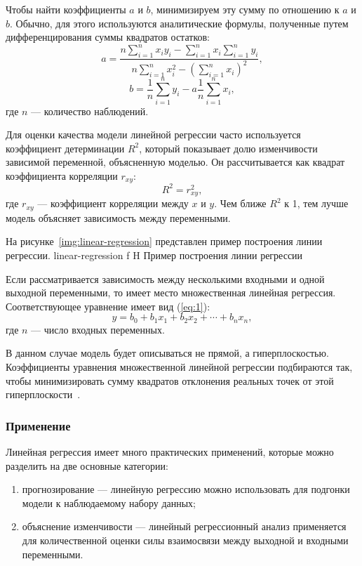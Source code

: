 Чтобы найти коэффициенты $a$ и $b$, минимизируем эту сумму по отношению к $a$ и $b$.
Обычно, для этого используются аналитические формулы, полученные путем дифференцирования суммы квадратов остатков:
\begin{equation}
    a = \frac{n \sum_{i=1}^{n} x_i y_i - \sum_{i=1}^{n} x_i \sum_{i=1}^{n} y_i}{n \sum_{i=1}^{n} x_i^2 - (\sum_{i=1}^{n} x_i)^2},
\end{equation}
\begin{equation}
    b = \frac{1}{n}\sum_{i=1}^{n} y_i - a\frac{1}{n}\sum_{i=1}^{n} x_i,
\end{equation}
где $n$ --- количество наблюдений.

Для оценки качества модели линейной регрессии часто используется коэффициент детерминации $R^2$, который показывает долю изменчивости зависимой переменной, объясненную моделью.
Он рассчитывается как квадрат коэффициента корреляции $r_{xy}$:
\begin{equation}
    R^2 = r_{xy}^2,
\end{equation}
где $r_{xy}$ --- коэффициент корреляции между $x$ и $y$.
Чем ближе $R^2$ к 1, тем лучше модель объясняет зависимость между переменными.

На рисунке~\ref{img:linear-regression} представлен пример построения линии регрессии.
{linear-regression}
{f}
{H}
{\textwidth}
{Пример построения линии регрессии}

Если рассматривается зависимость между несколькими входными и одной выходной переменными, то имеет место множественная линейная регрессия.
Соответствующее уравнение имеет вид (\ref{eq:1}):
\begin{equation}
    y = b_0 + b_1 x_1 + b_2 x_2 + \cdots+ b_n x_n,
    \label{eq:1}
\end{equation}
где $n$ --- число входных переменных.

В данном случае модель будет описываться не прямой, а гиперплоскостью.
Коэффициенты уравнения множественной линейной регрессии подбираются так, чтобы минимизировать сумму квадратов отклонения реальных точек от этой гиперплоскости~\cite{loginom}.

\subsubsection*{Применение}

Линейная регрессия имеет много практических применений, которые можно разделить на две основные категории:
\begin{enumerate}[label=\arabic*), leftmargin=1.6\parindent]
    \item прогнозирование --- линейную регрессию можно использовать для подгонки модели к наблюдаемому набору данных;
    \item объяснение изменчивости --- линейный регрессионный анализ применяется для количественной оценки силы взаимосвязи между выходной и входными переменными.
\end{enumerate}

